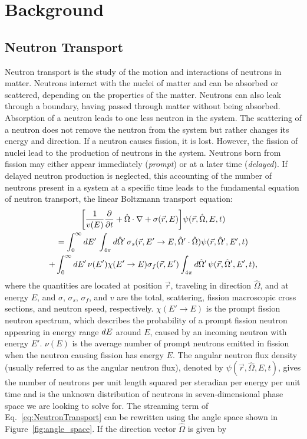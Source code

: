 \chapter{Background}

\section{Neutron Transport}

Neutron transport is the study of the motion and interactions of neutrons in matter. Neutrons interact with the nuclei of matter and can be absorbed or scattered, depending on the properties of the matter. Neutrons can also leak through a boundary, having passed through matter without being absorbed. Absorption of a neutron leads to one less neutron in the system. The scattering of a neutron does not remove the neutron from the system but rather changes its energy and direction. If a neutron causes fission, it is lost. However, the fission of nuclei lead to the production of neutrons in the system. Neutrons born from fission may either appear immediately (\textit{prompt}) or at a later time (\textit{delayed}). If delayed neutron production is neglected, this accounting of the number of neutrons present in a system at a specific time leads to the fundamental equation of neutron transport, the linear Boltzmann transport equation:
\begin{multline}
	\bigg [ \frac{1}{v(E)} \frac{\partial}{\partial t} + \hat{\Omega} \cdot \nabla + \sigma(\vec{r},E) \bigg ] \psi(\vec{r},\hat{\Omega},E,t) \\ = \int_{0}^{\infty} \mathop{}\!d E' \, \int_{4\pi} \mathop{}\!d \hat{\Omega}' \, \sigma_{s}(\vec{r},E'\rightarrow E,\hat{\Omega}' \cdot \hat{\Omega}) \psi(\vec{r},\hat{\Omega}',E',t) \\ + \int_{0}^{\infty} \mathop{}\!d E' \, \nu(E') \chi(E'\rightarrow E) \sigma_{f}(\vec{r},E') \int_{4\pi} \mathop{}\!d \hat{\Omega}' \, \psi(\vec{r},\hat{\Omega}',E',t), 
	\label{eq:NeutronTransport}
\end{multline}
where the quantities are located at position $\vec{r}$, traveling in direction $\hat{\Omega}$, and at energy $E$, and $\sigma$, $\sigma_{s}$, $\sigma_{f}$, and $v$ are the total, scattering, fission macroscopic cross sections, and neutron speed, respectively. $\chi(E'\rightarrow E)$ is the prompt fission neutron spectrum, which describes the probability of a prompt fission neutron appearing in energy range $\mathop{}\!d E$ around $E$, caused by an incoming neutron with energy $E'$. $\nu(E)$ is the average number of prompt neutrons emitted in fission when the neutron causing fission has energy $E$. The angular neutron flux density (usually referred to as the angular neutron flux), denoted by $\psi(\vec{r},\hat{\Omega},E,t)$, gives the number of neutrons per unit length squared per steradian per energy per unit time and is the unknown distribution of neutrons in seven-dimensional phase space we are looking to solve for. The streaming term of Eq.~\ref{eq:NeutronTransport} can be rewritten using the angle space shown in Figure~\ref{fig:angle_space}. If the direction vector $\hat{\Omega}$ is given by
